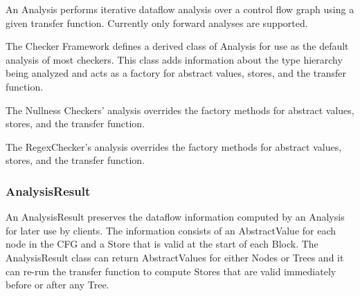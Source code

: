     An Analysis performs iterative dataflow analysis over a control flow graph using a given transfer function.  Currently only forward analyses are supported.


    The Checker Framework defines a derived class of Analysis for use as the default analysis of most checkers.  This class adds information about the type hierarchy being analyzed and acts as a factory for abstract values, stores, and the transfer function.

    

    The Nullness Checkers' analysis overrides the factory methods for abstract values, stores, and the transfer function.

    
    The RegexChecker's analysis overrides the factory methods for abstract values, stores, and the transfer function.



\subsubsection{AnalysisResult}
\label{sec:analysis_result_class}

    An AnalysisResult preserves the dataflow information computed by an Analysis for later use by clients.  The information consists of an AbstractValue for each node in the CFG and a Store that is valid at the start of each Block.  The AnalysisResult class can return AbstractValues for either Nodes or Trees and it can re-run the transfer function to compute Stores that are valid immediately before or after any Tree.



